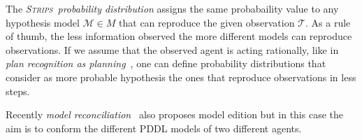 \documentclass[letterpaper]{article} %
\newcommand{\tup}[1]{{\langle #1 \rangle}}
\newcommand{\strips}{\textsc{Strips}}     %
\begin{document}
The {\em \strips\ probability distribution} assigns the same probabaility value to any hypothesis model $\mathcal{M}\in M$ that can reproduce the given observation $\mathcal{T}$. As a rule of thumb, the less information observed the more different models can reproduce observations. If we assume that the observed agent is acting rationally, like in {\em plan recognition as planning}~\cite{ramirez2012plan,ramirez2009plan}, one can define probability distributions that consider as more probable hypothesis the ones that reproduce observations in less steps. %

Recently {\em model reconciliation}~\cite{Kambhampati:mreconciliation:ijcai17} also proposes model edition but in this case the aim is to conform the different PDDL models of two different agents. 



\end{document}
